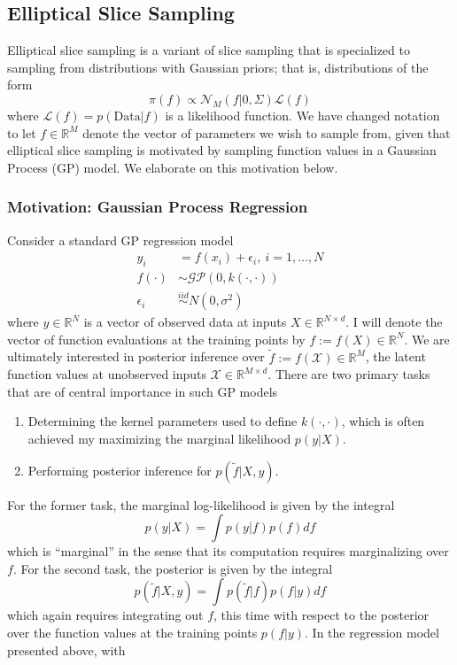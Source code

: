 \documentclass[12pt]{article}
\newcommand{\R}{\mathcal{R}}
\def\R{\mathbb{R}}
\begin{document}
\subsection{Elliptical Slice Sampling}
Elliptical slice sampling is a variant of slice sampling that is specialized to sampling from distributions with Gaussian priors; that is, distributions of the form 
\[\pi(f) \propto \mathcal{N}_M(f|0, \Sigma)\mathcal{L}(f)\]
where $\mathcal{L}(f) = p(\text{Data}|f)$ is a likelihood function. We have changed notation to let $f \in \R^M$ denote the vector of parameters we wish to sample from, given that elliptical slice sampling 
is motivated by sampling function values in a Gaussian Process (GP) model. We elaborate on this motivation below. 

\subsubsection{Motivation: Gaussian Process Regression}
Consider a standard GP regression model
\begin{align*}
y_i &= f(x_i) + \epsilon_i, \ i = 1, \dots, N \\
f(\cdot) &\sim \mathcal{GP}(0, k(\cdot, \cdot)) \\
\epsilon_i &\overset{iid}{\sim} N(0, \sigma^2)
\end{align*}
where $y \in \R^N$ is a vector of observed data at inputs $X \in \R^{N \times d}$. I will denote the vector of function evaluations at the training points by $f := f(X) \in \R^N$. 
We are ultimately interested in posterior inference over  $\tilde{f} := f(\mathcal{X}) \in \R^M$, the latent function values at unobserved inputs $\mathcal{X} \in \R^{M \times d}$.
There are two primary tasks that are of central importance in such GP models 
\begin{enumerate}
\item Determining the kernel parameters used to define $k(\cdot, \cdot)$, which is often achieved my maximizing the marginal likelihood $p(y|X)$. 
\item Performing posterior inference for $p(\tilde{f}|X, y)$.
\end{enumerate}
For the former task, the marginal log-likelihood is given by the integral
\[p(y|X) = \int p(y|f)p(f) df\] 
which is ``marginal'' in the sense that its computation requires marginalizing over $f$. For the second task, the posterior is given by the integral
\[p(\tilde{f}|X, y) = \int p(\tilde{f}|f)p(f|y) df\]
which again requires integrating out $f$, this time with respect to the posterior over the function values at the training points $p(f|y)$. In the regression model presented above, with 
\end{document}
